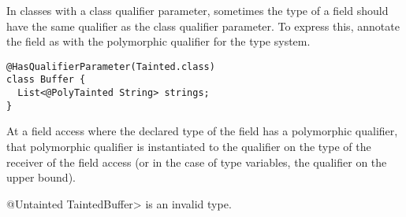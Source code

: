 
In classes with a class qualifier parameter, sometimes the type of a field
should have the same qualifier as the class qualifier parameter. To express
this, annotate the field as with the polymorphic qualifier for the type system.

\begin{Verbatim}
@HasQualifierParameter(Tainted.class)
class Buffer {
  List<@PolyTainted String> strings;
}
\end{Verbatim}

At a field access where the declared type of the field has a polymorphic
qualifier, that polymorphic qualifier is instantiated to the qualifier on the
type of the receiver of the field access (or in the case of type variables, the
qualifier on the upper bound).

%
%

\<@Untainted TaintedBuffer> is an invalid type.


